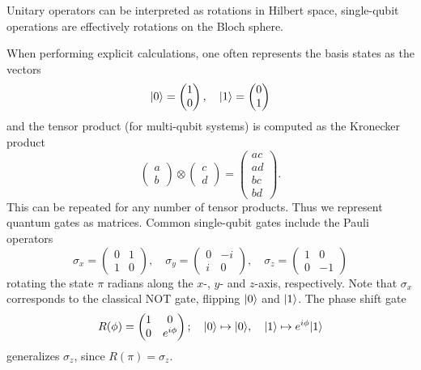 \documentclass[a4paper,10pt,oneside]{book}
\theoremstyle{plain}
\theoremstyle{definition}
\theoremstyle{remark}
\DeclarePairedDelimiter\ket{\lvert}{\rangle}
\begin{document}
Unitary operators can be interpreted as rotations in Hilbert space, single-qubit operations are effectively rotations on the Bloch sphere.

When performing explicit calculations, one often represents the basis states as the vectors
\begin{equation}
  \ket{0} = \begin{pmatrix} 1 \\ 0\end{pmatrix}, \quad \ket{1} = \begin{pmatrix} 0 \\ 1 \end{pmatrix}
\end{equation}
and the tensor product (for multi-qubit systems) is computed as the Kronecker product
\begin{equation}
  \begin{pmatrix} a \\ b \end{pmatrix} \otimes \begin{pmatrix} c \\ d \end{pmatrix}
  = \begin{pmatrix} ac \\ ad \\ bc \\ bd \end{pmatrix}.
\end{equation}
This can be repeated for any number of tensor products. Thus we represent quantum gates as matrices. Common single-qubit gates include the Pauli operators
\begin{equation}
  \sigma_x = \begin{pmatrix} 0 & 1 \\ 1 & 0 \end{pmatrix}, \quad
  \sigma_y = \begin{pmatrix} 0 & -i \\ i & 0 \end{pmatrix}, \quad
  \sigma_z = \begin{pmatrix} 1 & 0 \\ 0 & -1 \end{pmatrix}
\end{equation}
rotating the state $\pi$ radians along the $x$-, $y$- and $z$-axis, respectively. Note that $\sigma_x$ corresponds to the classical NOT gate, flipping $\ket{0}$ and $\ket{1}$.  The phase shift gate
\begin{equation}
  R(\phi) =
  \begin{pmatrix}
    1 & 0 \\
    0 & e^{i\phi}
  \end{pmatrix};\quad
  \ket{0} \mapsto \ket{0},\quad
  \ket{1} \mapsto e^{i\phi} \ket{1}
\end{equation}
generalizes $σ_z$, since $R(\pi) = \sigma_z$.
\end{document}
